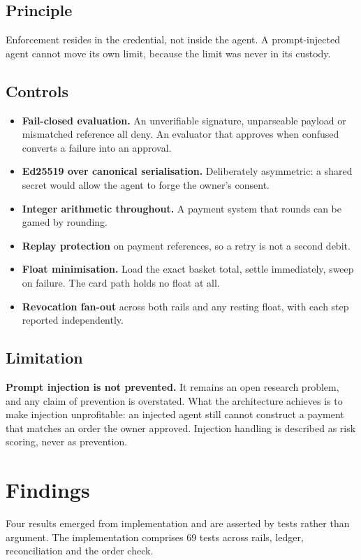 \documentclass[journal,onecolumn,11pt]{IEEEtran}
\begin{document}
\subsection{Principle}
Enforcement resides in the credential, not inside the agent. A prompt-injected agent
cannot move its own limit, because the limit was never in its custody.

\subsection{Controls}
\begin{itemize}[leftmargin=*]
\item \textbf{Fail-closed evaluation.} An unverifiable signature, unparseable payload
or mismatched reference all deny. An evaluator that approves when confused converts a
failure into an approval.
\item \textbf{Ed25519 over canonical serialisation.} Deliberately asymmetric: a shared
secret would allow the agent to forge the owner's consent.
\item \textbf{Integer arithmetic throughout.} A payment system that rounds can be
gamed by rounding.
\item \textbf{Replay protection} on payment references, so a retry is not a second debit.
\item \textbf{Float minimisation.} Load the exact basket total, settle immediately,
sweep on failure. The card path holds no float at all.
\item \textbf{Revocation fan-out} across both rails and any resting float, with each
step reported independently.
\end{itemize}

\subsection{Limitation}
\textbf{Prompt injection is not prevented.} It remains an open research problem, and
any claim of prevention is overstated. What the architecture achieves is to make
injection unprofitable: an injected agent still cannot construct a payment that
matches an order the owner approved. Injection handling is described as risk scoring,
never as prevention.

\section{Findings}\label{sec:findings}
Four results emerged from implementation and are asserted by tests rather than
argument. The implementation comprises 69 tests across rails, ledger, reconciliation
and the order check.
\end{document}
